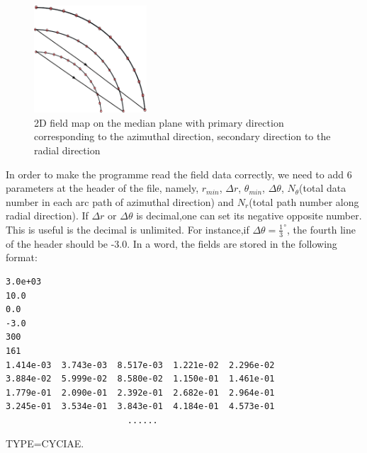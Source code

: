 \begin{figure}[ht]
  \begin{center}
    \includegraphics[origin=bl,height=40mm]{./figures/cyclotron/CarbonFieldFormat.pdf}
    \caption{2D field map on the median plane with primary direction corresponding to the azimuthal direction, secondary direction to the radial direction}
    \label{fig:CYCLField}
  \end{center}
\end{figure}
In order to make the programme read the field data correctly, we need to add 6 parameters at the header of the file, namely, 
$r_{min}$, $\Delta r$, $\theta_{min}$, $\Delta \theta$, 
$N_\theta$(total data number in each arc path of azimuthal direction) and $N_r$(total path number along radial direction). 
If $\Delta r$ or $\Delta \theta$ is decimal,one can set its negative opposite number. This is useful is the decimal is unlimited. 
For instance,if $\Delta \theta = \frac{1}{3}^\circ$, the fourth line of the header should be -3.0. 
In a word, the fields are stored in the following format:
\begin{fmpage}
\begin{footnotesize}
\begin{verbatim}
3.0e+03
10.0
0.0
-3.0
300
161
1.414e-03  3.743e-03  8.517e-03  1.221e-02  2.296e-02 
3.884e-02  5.999e-02  8.580e-02  1.150e-01  1.461e-01 
1.779e-01  2.090e-01  2.392e-01  2.682e-01  2.964e-01 
3.245e-01  3.534e-01  3.843e-01  4.184e-01  4.573e-01 
                        ......
\end{verbatim}
\end{footnotesize}
\end{fmpage}
\item TYPE=CYCIAE. 


